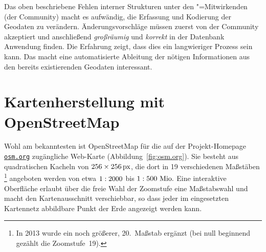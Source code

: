 \documentclass[../main/thesis.tex]{subfiles}
\begin{document}
Das oben beschriebene Fehlen interner Strukturen unter den \osm"=Mitwirkenden (der Community) macht es aufwändig, die Erfassung und Kodierung der Geodaten zu verändern. 
Änderungsvorschläge müssen zuerst von der Community akzeptiert und anschließend \emph{großräumig} und \emph{korrekt} in der Datenbank Anwendung finden.
Die Erfahrung zeigt, dass dies ein langwieriger Prozess sein kann.
Das macht eine automatisierte Ableitung der nötigen Informationen aus den bereits existierenden Geodaten interessant.



\section{Kartenherstellung mit OpenStreetMap} \label{kartenherstellung}

Wohl am bekanntesten ist OpenStreetMap für die auf der Projekt-Homepage \href{https://www.openstreetmap.org/}{\nolinkurl{osm.org}} zugängliche Web-Karte (Abbildung~\ref{fig:osm.org}).
Sie besteht aus quadratischen Kacheln  von $256\times\unit[256]{px}$, die dort in 19 verschiedenen Maßstäben%
\footnote{In 2013 wurde ein noch größerer, 20.~Maßstab ergänzt (bei null beginnend gezählt  die Zoomstufe~19).}
angeboten werden von etwa $1 \nobreak : \nobreak 2000$ bis $1 \nobreak : \nobreak 500~\unit{Mio.}$ 
Eine interaktive Oberfläche erlaubt über die freie Wahl der Zoomstufe eine Maßstabswahl und macht den Kartenausschnitt verschiebbar, so dass jeder im eingesetzten Kartennetz abbildbare Punkt der Erde angezeigt werden kann.

\end{document}
